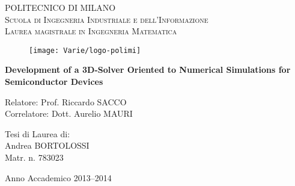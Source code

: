 \begin{titlepage}
\begin{center}
    { \scshape 
    POLITECNICO DI MILANO \\
    Scuola di Ingegneria Industriale e dell'Informazione \\
    Laurea magistrale in Ingegneria Matematica\\
    }
\end{center}

\vspace{0.5cm}

\begin{figure}[h]
		\centering
		\texttt{[image: Varie/logo-polimi]}
\end{figure}

\vspace{1.0cm}
		
\begin{center}
\bf  \LARGE 
Development of a 3D-Solver Oriented to Numerical Simulations for Semiconductor Devices
\end{center}

\vspace{2cm}

\begin{flushleft}
Relatore: Prof. Riccardo SACCO \\
Correlatore: Dott. Aurelio MAURI
\end{flushleft}

\vspace{1cm}

\begin{flushright}
		Tesi di Laurea di:\\
		Andrea BORTOLOSSI\\
		Matr. n. 783023\\
\end{flushright}

\vspace{1.5cm}

\begin{center}
Anno Accademico 2013--2014
\end{center}

\end{titlepage}